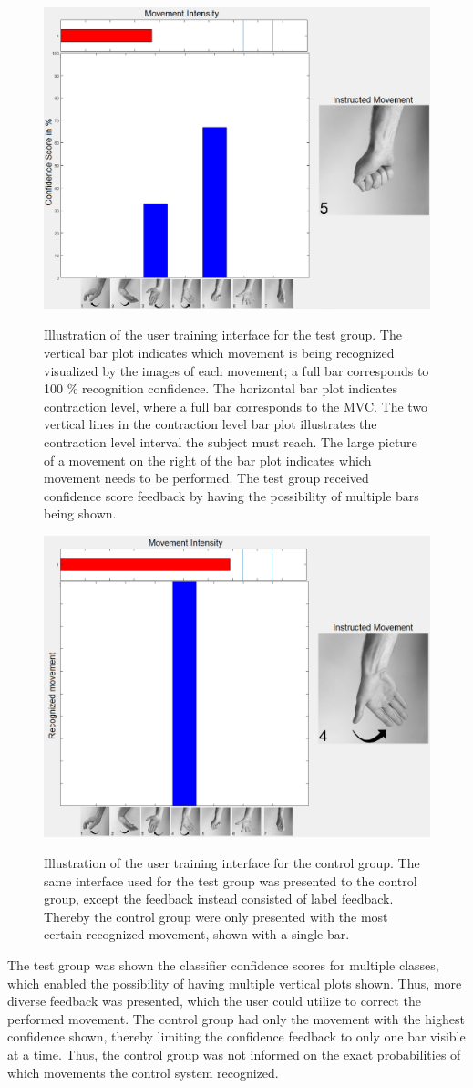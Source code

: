\begin{figure}[H]
	\includegraphics[width=.47\textwidth]{figures/xBackground/usertraintestGUI} \\
	\caption{Illustration of the user training interface for the test group. The vertical bar plot indicates which movement is being recognized visualized by the images of each movement; a full bar corresponds to 100 \% recognition confidence. The horizontal bar plot indicates contraction level, where a full bar corresponds to the MVC. The two vertical lines in the contraction level bar plot illustrates the contraction level interval the subject must reach. The large picture of a movement on the right of the bar plot indicates which movement needs to be performed. The test group received confidence score feedback by having the possibility of multiple bars being shown.}
	\label{fig:test}
\end{figure}



\begin{figure}[H]
	\includegraphics[width=.47\textwidth]{figures/xBackground/usertraincontrolGUI} \\
	\caption{Illustration of the user training interface for the control group. The same interface used for the test group was presented to the control group, except the feedback instead consisted of label feedback. Thereby the control group were only presented with the most certain recognized movement, shown with a single bar.}
	\label{fig:control}
\end{figure}
The test group was shown the classifier confidence scores for multiple classes, which enabled the possibility of having multiple vertical plots shown. Thus, more diverse feedback was presented, which the user could utilize to correct the performed movement. The control group had only the movement with the highest confidence shown, thereby limiting the confidence feedback to only one bar visible at a time. Thus, the control group was not informed on the exact probabilities of which movements the control system recognized.      


